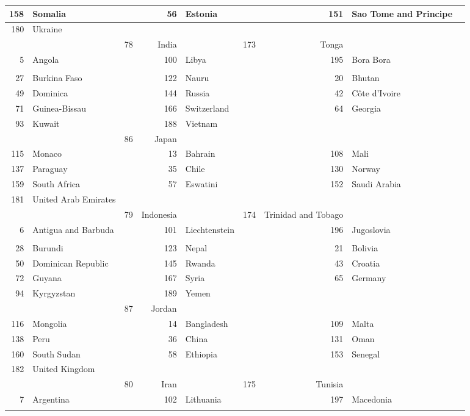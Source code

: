 \documentclass[12pt,a4paper]{article}
\begin{document}
\begin{longtable}{|r l c| r l c| r l c|}
158 & Somalia &  & 56 & Estonia &  & 151 & Sao Tome and Principe &  \\ \hline
180 & Ukraine \\ \hline &  & 78 & India &  & 173 & Tonga &  \\ \hline
5 & Angola &  & 100 & Libya &  & 195 & Bora Bora \\ \hline &  \\ \hline
27 & Burkina Faso &  & 122 & Nauru &  & 20 & Bhutan &  \\ \hline
49 & Dominica &  & 144 & Russia &  & 42 & Côte d'Ivoire &  \\ \hline
71 & Guinea-Bissau &  & 166 & Switzerland &  & 64 & Georgia &  \\ \hline
93 & Kuwait &  & 188 & Vietnam \\ \hline &  & 86 & Japan &  \\ \hline
115 & Monaco &  & 13 & Bahrain &  & 108 & Mali &  \\ \hline
137 & Paraguay &  & 35 & Chile &  & 130 & Norway &  \\ \hline
159 & South Africa &  & 57 & Eswatini &  & 152 & Saudi Arabia &  \\ \hline
181 & United Arab Emirates \\ \hline &  & 79 & Indonesia &  & 174 & Trinidad and Tobago &  \\ \hline
6 & Antigua and Barbuda &  & 101 & Liechtenstein &  & 196 & Jugoslovia \\ \hline &  \\ \hline
28 & Burundi &  & 123 & Nepal &  & 21 & Bolivia &  \\ \hline
50 & Dominican Republic &  & 145 & Rwanda &  & 43 & Croatia &  \\ \hline
72 & Guyana &  & 167 & Syria &  & 65 & Germany &  \\ \hline
94 & Kyrgyzstan &  & 189 & Yemen \\ \hline &  & 87 & Jordan &  \\ \hline
116 & Mongolia &  & 14 & Bangladesh &  & 109 & Malta &  \\ \hline
138 & Peru &  & 36 & China &  & 131 & Oman &  \\ \hline
160 & South Sudan &  & 58 & Ethiopia &  & 153 & Senegal &  \\ \hline
182 & United Kingdom \\ \hline &  & 80 & Iran &  & 175 & Tunisia &  \\ \hline
7 & Argentina &  & 102 & Lithuania &  & 197 & Macedonia \\ \hline &  \\ \hline

\end{longtable}
\end{document}
